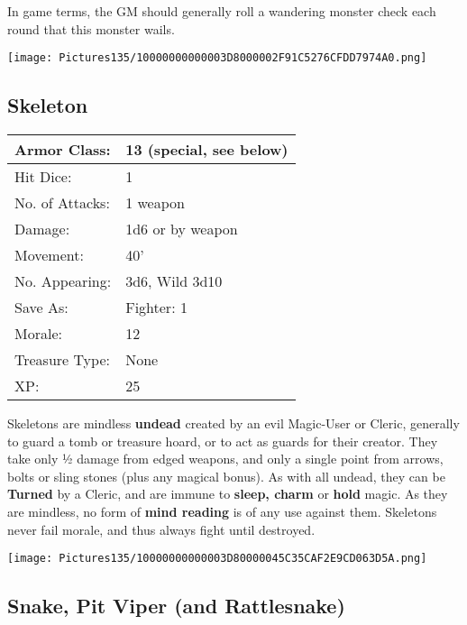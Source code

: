 \documentclass[a4paper,twoside,openany,10pt]{book}
\begin{document}
\begin{multicols}{2}
In game terms, the GM should generally roll a wandering monster check each
round that this monster wails.

\begin{center} \texttt{[image: Pictures135/10000000000003D8000002F91C5276CFDD7974A0.png]} \end{center}


\subsection*{Skeleton}\label{skeleton}

\begin{tabularx}{0.50\textwidth}{@{}lX@{}}
Armor Class: & 13 (special, see below) \\\hline
Hit Dice: & 1 \\\hline
No. of Attacks: & 1 weapon \\\hline
Damage: & 1d6 or by weapon \\\hline
Movement: & 40' \\\hline
No. Appearing: & 3d6, Wild 3d10 \\\hline
Save As: & Fighter: 1 \\\hline
Morale: & 12 \\\hline
Treasure Type: & None \\\hline
XP: & 25 \\\hline
\end{tabularx}\medskip

Skeletons
are mindless \textbf{undead} created by an evil Magic-User or Cleric, generally to guard a tomb or treasure hoard, or to act as guards for their creator. They take only ½ damage from edged weapons, and only a single point from arrows, bolts or sling stones (plus any magical bonus). As with all undead, they can be \textbf{Turned} by a Cleric, and are immune to \textbf{sleep, charm} or \textbf{hold} magic. As they are mindless, no form of \textbf{mind reading} is of any use against them. Skeletons never fail morale, and thus always fight until destroyed.

\begin{center} \texttt{[image: Pictures135/10000000000003D80000045C35CAF2E9CD063D5A.png]} \end{center}


\subsection*{Snake, Pit Viper (and Rattlesnake)}\label{snake-pit-viper-and-rattlesnake}


\end{multicols}
\end{document}

